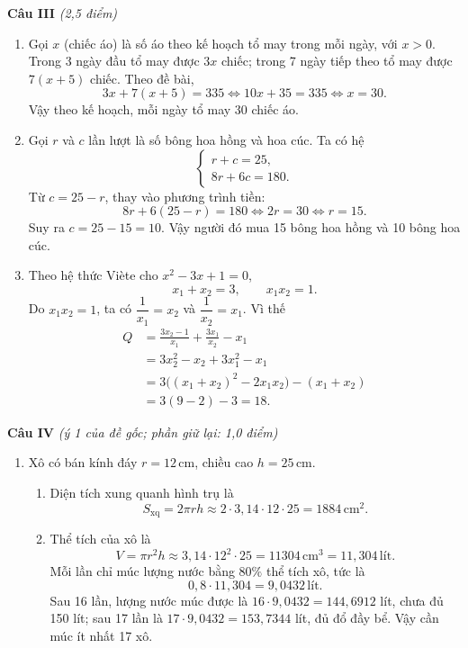 \documentclass[12pt,a4paper]{article}
\newcommand{\diem}[1]{\textit{(#1 điểm)}}
\begin{document}
\textbf{Câu III} \diem{2,5}
\begin{enumerate}
  \item Gọi $x$ (chiếc áo) là số áo theo kế hoạch tổ may trong mỗi ngày, với $x>0$. Trong 3 ngày đầu tổ may được $3x$ chiếc; trong 7 ngày tiếp theo tổ may được $7(x+5)$ chiếc. Theo đề bài,
  \[
    3x+7(x+5)=335
    \iff 10x+35=335
    \iff x=30.
  \]
  Vậy theo kế hoạch, mỗi ngày tổ may 30 chiếc áo.

  \item Gọi $r$ và $c$ lần lượt là số bông hoa hồng và hoa cúc. Ta có hệ
  \[
    \begin{cases}
      r+c=25,\\
      8r+6c=180.
    \end{cases}
  \]
  Từ $c=25-r$, thay vào phương trình tiền:
  \[
    8r+6(25-r)=180
    \iff 2r=30
    \iff r=15.
  \]
  Suy ra $c=25-15=10$. Vậy người đó mua 15 bông hoa hồng và 10 bông hoa cúc.

  \item Theo hệ thức Viète cho $x^2-3x+1=0$,
  \[
    x_1+x_2=3,\qquad x_1x_2=1.
  \]
  Do $x_1x_2=1$, ta có $\dfrac1{x_1}=x_2$ và $\dfrac1{x_2}=x_1$. Vì thế
  \begin{align*}
    Q&=\frac{3x_2-1}{x_1}+\frac{3x_1}{x_2}-x_1\\
     &=3x_2^2-x_2+3x_1^2-x_1\\
     &=3\bigl((x_1+x_2)^2-2x_1x_2\bigr)-(x_1+x_2)\\
     &=3(9-2)-3=18.
  \end{align*}
\end{enumerate}

\textbf{Câu IV} \textit{(ý 1 của đề gốc; phần giữ lại: 1,0 điểm)}
\begin{enumerate}
  \item Xô có bán kính đáy $r=12\,\mathrm{cm}$, chiều cao $h=25\,\mathrm{cm}$.
  \begin{enumerate}[label=\alph*)]
    \item Diện tích xung quanh hình trụ là
    \[
      S_{\mathrm{xq}}=2\pi rh\approx2\cdot3{,}14\cdot12\cdot25=1884\,\mathrm{cm}^2.
    \]
    \item Thể tích của xô là
    \[
      V=\pi r^2h\approx3{,}14\cdot12^2\cdot25=11304\,\mathrm{cm}^3=11{,}304\,\mathrm{lít}.
    \]
    Mỗi lần chỉ múc lượng nước bằng $80\%$ thể tích xô, tức là
    \[
      0{,}8\cdot11{,}304=9{,}0432\,\mathrm{lít}.
    \]
    Sau 16 lần, lượng nước múc được là $16\cdot9{,}0432=144{,}6912$ lít, chưa đủ 150 lít; sau 17 lần là $17\cdot9{,}0432=153{,}7344$ lít, đủ đổ đầy bể. Vậy cần múc ít nhất 17 xô.
  \end{enumerate}
\end{enumerate}
\end{document}
